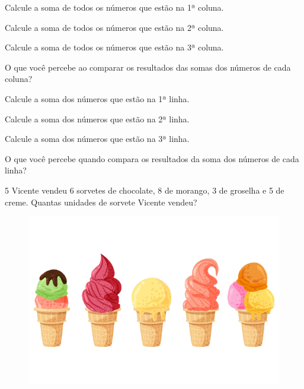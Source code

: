 \begin{escolha}
\item Calcule a soma de todos os números que estão na 1ª coluna.\\

\pagebreak
\item Calcule a soma de todos os números que estão na 2ª coluna.\\

\item Calcule a soma de todos os números que estão na 3ª coluna.\\

\item O que você percebe ao comparar os resultados das somas dos números de cada coluna?\\

\item Calcule a soma dos números que estão na 1ª linha.\\

\item Calcule a soma dos números que estão na 2ª linha.\\

\item Calcule a soma dos números que estão na 3ª linha.\\

\item O que você percebe quando compara os resultados da soma dos números de cada linha?\\
\end{escolha}

\num{5} Vicente vendeu 6 sorvetes de chocolate, 8 de morango, 3
de groselha e 5 de creme. Quantas unidades de sorvete Vicente vendeu?
\begin{figure}[htpb!]
\centering
\includegraphics[width=.5\textwidth]{./media/image14a.png}
\end{figure}


